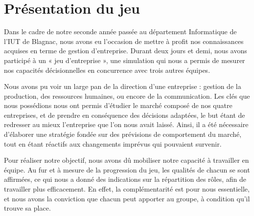 \chapter{Présentation du jeu}

Dans le cadre de notre seconde année passée au département Informatique de l'IUT de Blagnac, nous avons eu l'occasion de mettre à profit nos connaissances acquises en terme de gestion d'entreprise. Durant deux jours et demi, nous avons participé à un « jeu d'entreprise », une simulation qui nous a permis de mesurer nos capacités décisionnelles en concurrence avec trois autres équipes.

Nous avons pu voir un large pan de la direction d'une entreprise : gestion de la production, des ressources humaines, ou encore de la communication. Les clés que nous possédions nous ont permis d'étudier le marché composé de nos quatre entreprises, et de prendre en conséquence des décisions adaptées, le but étant de redresser au mieux l'entreprise que l'on nous avait laissé. Ainsi, il a été nécessaire d'élaborer une stratégie fondée sur des prévisions de comportement du marché, tout en étant réactifs aux changements imprévus qui pouvaient survenir.

Pour réaliser notre objectif, nous avons dû mobiliser notre capacité à travailler en équipe. Au fur et à mesure de la progression du jeu, les qualités de chacun se sont affirmées, ce qui nous a donné des indications sur la répartition des rôles, afin de travailler plus efficacement. En effet, la complémentarité est pour nous essentielle, et nous avons la conviction que chacun peut apporter au groupe, à condition qu'il trouve sa place.